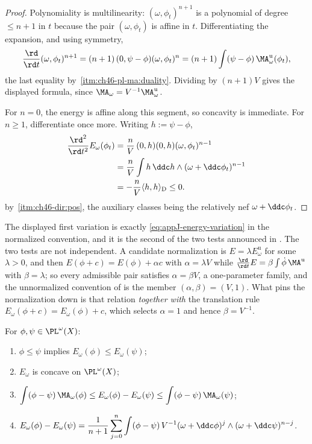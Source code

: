 \begin{proof}
Polynomiality is multilinearity: $(\omega,\phi_t)^{n+1}$ is a polynomial
of degree $\le n+1$ in $t$ because the pair $(\omega,\phi_t)$ is
affine in $t$.  Differentiating the expansion, and using symmetry,
\[
 \frac{\rd}{\rd t}(\omega,\phi_t)^{n+1}
 =(n+1)\,(0,\psi-\phi)(\omega,\phi_t)^{n}
 =(n+1)\int(\psi-\phi)\,\MA^{\mathrm u}_\omega(\phi_t),
\]
the last equality by
\,\cref{itm:ch46-pl-ma:duality}.  Dividing by
$(n+1)V$ gives the displayed formula, since
$\MA_\omega=V^{-1}\MA^{\mathrm u}_\omega$.

For $n=0$, the energy is affine along this segment, so concavity is
immediate.  For $n\ge1$, differentiate once more.  Writing
$h:=\psi-\phi$,
\[
 \begin{aligned}
 \frac{\rd^2}{\rd t^2}E_\omega(\phi_t)
 &=\frac{n}{V}\,(0,h)(0,h)(\omega,\phi_t)^{n-1}\\
 &=\frac nV\int h\,\ddc h
     \wedge(\omega+\ddc\phi_t)^{n-1}\\
 &=-\frac nV\langle h,h\rangle_{\mathrm D}\le0 .
 \end{aligned}
\]
by \,\cref{itm:ch46-dir:pos}, the
auxiliary classes being the relatively nef $\omega+\ddc\phi_t$.
\end{proof}

The displayed first variation is exactly
\eqref{eq:appJ-energy-variation} in the normalized convention, and it is
the second of the two tests announced in .
The two tests are not independent.  A candidate normalization is
$E=\lambda E^{\mathrm u}_\omega$ for some $\lambda>0$, and then
$E(\phi+c)=E(\phi)+\alpha c$ with $\alpha=\lambda V$ while
$\frac{\rd}{\rd t}E=\beta\int\dot\phi\,\MA^{\mathrm u}$ with
$\beta=\lambda$; so every admissible pair satisfies $\alpha=\beta V$, a
one-parameter family, and the unnormalized convention of  is
the member $(\alpha,\beta)=(V,1)$.  What pins the normalization down is
that relation \emph{together with} the translation rule
$E_\omega(\phi+c)=E_\omega(\phi)+c$, which selects $\alpha=1$ and hence
$\beta=V^{-1}$.

\begin{corollary}
\label{cor:ch46-pl-tangent}
For $\phi,\psi\in\PL^{\omega}(X)$:
\begin{enumerate}
\item\label{itm:ch46-tan:mono}
      $\phi\le\psi$ implies $E_\omega(\phi)\le E_\omega(\psi)$;
\item\label{itm:ch46-tan:concave}
      $E_\omega$ is concave on $\PL^{\omega}(X)$;
\item\label{itm:ch46-tan:tangent}
      $\displaystyle\int(\phi-\psi)\,\MA_\omega(\phi)
        \le E_\omega(\phi)-E_\omega(\psi)
        \le\int(\phi-\psi)\,\MA_\omega(\psi)$;
\item\label{itm:ch46-tan:cocycle}
      $\displaystyle
       E_\omega(\phi)-E_\omega(\psi)
       =\frac1{n+1}\sum_{j=0}^n\int(\phi-\psi)\,
        V^{-1}(\omega+\ddc\phi)^j\wedge(\omega+\ddc\psi)^{n-j}$.
\end{enumerate}
\end{corollary}

